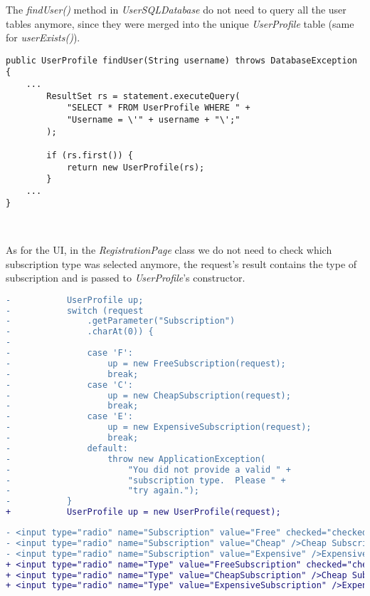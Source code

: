 The \emph{findUser()} method in \emph{UserSQLDatabase} do not need to
query all the user tables anymore, since they were merged into the
unique \emph{UserProfile} table (same for \emph{userExists()}).\\

\begin{lstlisting}
public UserProfile findUser(String username) throws DatabaseException {
    ...
        ResultSet rs = statement.executeQuery(
            "SELECT * FROM UserProfile WHERE " +
            "Username = \'" + username + "\';"
        );
        
        if (rs.first()) {
            return new UserProfile(rs);
        }
    ...
}
\end{lstlisting}
\

As for the UI, in the \emph{RegistrationPage} class we do not need to
check which subscription type was selected anymore, the request's result
contains the type of subscription and is passed to \emph{UserProfile}'s
constructor.\\

\begin{lstlisting}[language=diff]
-           UserProfile up;
-           switch (request
-               .getParameter("Subscription")
-               .charAt(0)) {
-
-               case 'F':
-                   up = new FreeSubscription(request);
-                   break;
-               case 'C':
-                   up = new CheapSubscription(request);
-                   break;
-               case 'E':
-                   up = new ExpensiveSubscription(request);
-                   break;
-               default:
-                   throw new ApplicationException(
-                       "You did not provide a valid " +
-                       "subscription type.  Please " +
-                       "try again.");
-           }
+           UserProfile up = new UserProfile(request);
\end{lstlisting}

\begin{lstlisting}[language=diff]
- <input type="radio" name="Subscription" value="Free" checked="checked" />Free Subscription<br />
- <input type="radio" name="Subscription" value="Cheap" />Cheap Subscription<br />
- <input type="radio" name="Subscription" value="Expensive" />Expensive Subscription<br />
+ <input type="radio" name="Type" value="FreeSubscription" checked="checked" />Free Subscription<br />
+ <input type="radio" name="Type" value="CheapSubscription" />Cheap Subscription<br />
+ <input type="radio" name="Type" value="ExpensiveSubscription" />Expensive Subscription<br />
\end{lstlisting}

\newpage
